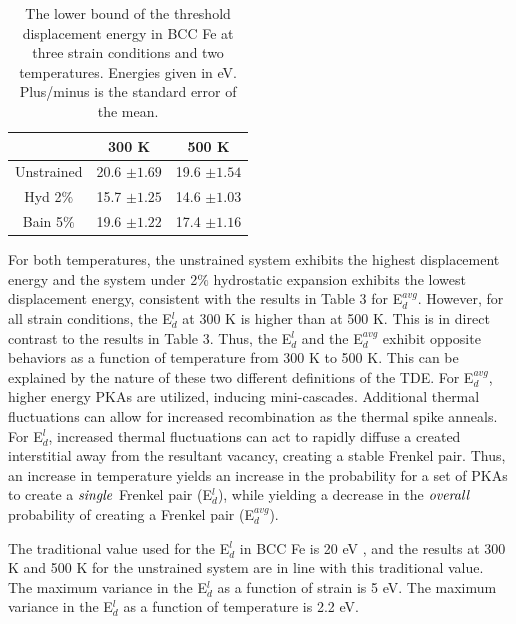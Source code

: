 \documentclass[review]{elsarticle}
\begin{document}
\begin{table}[htbp]
\caption{The lower bound of the threshold displacement energy in BCC Fe at three strain conditions and two temperatures.  Energies given in eV.  Plus/minus is the standard error of the mean.}
\begin{center}
\begin{tabular}{|c|c|c|}
	\hline
	& 300 K & 500 K \\
	 \hline
	 Unstrained & 20.6 $\pm 1.69$ & 19.6 $\pm 1.54$ \\
	 Hyd 2$\% $  & 15.7 $\pm 1.25$ & 14.6 $\pm 1.03$ \\
	 Bain 5$\%$  & 19.6 $\pm 1.22$ & 17.4 $\pm 1.16$ \\
	 \hline
\end{tabular}
\end{center}
\label{default}
\end{table}

For both temperatures, the unstrained system exhibits the highest displacement energy and the system under 2$\%$ hydrostatic expansion exhibits the lowest displacement energy, consistent with the results in Table 3 for E$^{avg}_{d}$.  However, for all strain conditions, the E$^{l}_{d}$ at 300 K is higher than at 500 K.  This is in direct contrast to the results in Table 3.  Thus, the E$^{l}_{d}$ and the E$^{avg}_{d}$ exhibit opposite behaviors as a function of temperature from 300 K to 500 K.  This can be explained by the nature of these two different definitions of the TDE.  For E$^{avg}_{d}$, higher energy PKAs are utilized, inducing mini-cascades.  Additional thermal fluctuations can allow for increased recombination as the thermal spike anneals.  For E$^{l}_{d}$, increased thermal fluctuations can act to rapidly diffuse a created interstitial away from the resultant vacancy, creating a stable Frenkel pair.  Thus, an increase in temperature yields an increase in the probability for a set of PKAs to create a $\it{single}$ Frenkel pair (E$^{l}_{d}$), while yielding a decrease in the $\it{overall}$ probability of creating a Frenkel pair (E$^{avg}_{d}$).

The traditional value used for the E$^{l}_{d}$ in BCC Fe is 20 eV \cite{was2007}, and the results at 300 K and 500 K for the unstrained system are in line with this traditional value.  The maximum variance in the E$^{l}_{d}$ as a function of strain is 5 eV.  The maximum variance in the E$^{l}_{d}$ as a function of temperature is 2.2 eV.  
\end{document}
